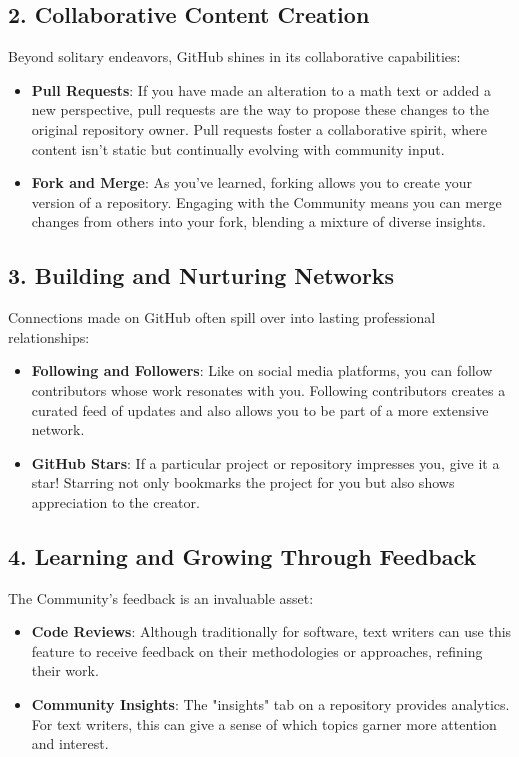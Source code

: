 \documentclass[a4paper,12pt]{book}
\begin{document}
\subsection*{2. Collaborative Content Creation}
Beyond solitary endeavors, GitHub shines in its collaborative capabilities:

\begin{itemize}
    \item \textbf{Pull Requests}: If you have made an alteration to a math text or added a new perspective, pull requests are the way to propose these changes to the original repository owner. Pull requests foster a collaborative spirit, where content isn't static but continually evolving with community input.
    \item \textbf{Fork and Merge}: As you've learned, forking allows you to create your version of a repository. Engaging with the Community means you can merge changes from others into your fork, blending a mixture of diverse insights.
\end{itemize}

\subsection*{3. Building and Nurturing Networks}
Connections made on GitHub often spill over into lasting professional relationships:

\begin{itemize}
    \item \textbf{Following and Followers}: Like on social media platforms, you can follow contributors whose work resonates with you. Following contributors creates a curated feed of updates and also allows you to be part of a more extensive network.
    \item \textbf{GitHub Stars}: If a particular project or repository impresses you, give it a star! Starring not only bookmarks the project for you but also shows appreciation to the creator.
\end{itemize}

\subsection*{4. Learning and Growing Through Feedback}
The Community's feedback is an invaluable asset:

\begin{itemize}
    \item \textbf{Code Reviews}: Although traditionally for software, text writers can use this feature to receive feedback on their methodologies or approaches, refining their work.
    \item \textbf{Community Insights}: The "insights" tab on a repository provides analytics. For text writers, this can give a sense of which topics garner more attention and interest.
\end{itemize}
\end{document}
